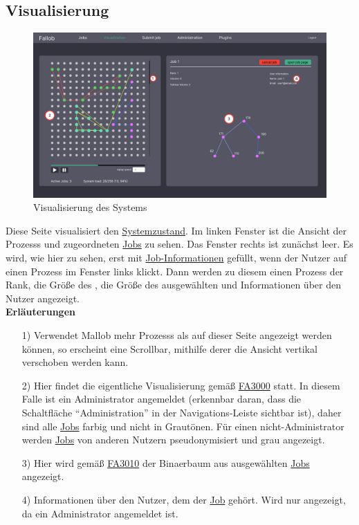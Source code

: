 \newpage
\subsection{Visualisierung}
\label{pages:visualization}
\begin{figure}[H]
    \centering
    \includegraphics[width=\textwidth]{images-interface/v6_interface/visualization_page_6.pdf}
    \caption{Visualisierung des Systems}
    \label{fig:visualization-page}
\end{figure}
Diese Seite visualisiert den \hyperref[B:Systemzustand]{Systemzustand}. Im linken Fenster ist die Ansicht der \glspl{Prozess} und zugeordneten \hyperref[B:Jobs]{Jobs} zu sehen. Das Fenster rechts ist zunächst leer. Es wird, wie hier zu sehen, erst mit \hyperref[B:Job-Informationen]{Job-Informationen} gefüllt, wenn der \gls{Nutzer} auf einen Prozess im Fenster links klickt. Dann werden zu diesem einen Prozess der Rank, die Größe des , die Größe des ausgewählten  und Informationen über den \gls{Nutzer} angezeigt.\\

\textbf{Erläuterungen}
\begin{itemize}
    \item[1)] Verwendet Mallob mehr \glspl{Prozess} als auf dieser Seite angezeigt werden können, so erscheint eine Scrollbar, mithilfe derer die Ansicht vertikal verschoben werden kann.
    \item[2)] Hier findet die eigentliche Visualisierung gemäß \hyperref[FA:Web-Interface:Verifizieren eines Kontos]{FA3000} statt. In diesem Falle ist ein \gls{Administrator} angemeldet (erkennbar daran, dass die Schaltfläche \enquote{Administration} in der Navigations-Leiste sichtbar ist), daher sind alle \hyperref[B:Jobs]{Jobs} farbig und nicht in Grautönen. Für einen nicht-\gls{Administrator} werden \hyperref[B:Jobs]{Jobs} von anderen Nutzern pseudonymisiert und grau angezeigt.
    \item[3)] Hier wird gemäß \hyperref[FA:Visualisierung:Anzeigen des Binaerbaumes für einen Job]{FA3010} der \gls{Binaerbaum} aus ausgewählten \hyperref[B:Jobs]{Jobs} angezeigt.
    \item[4)] Informationen über den \gls{Nutzer}, dem der \hyperref[B:Jobs]{Job} gehört. Wird nur angezeigt, da ein \gls{Administrator} angemeldet ist.
\end{itemize}

